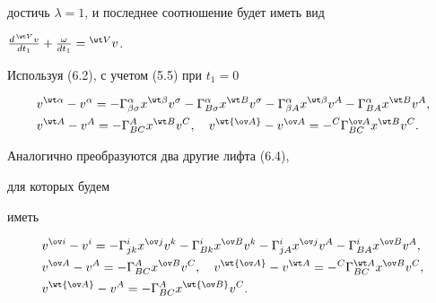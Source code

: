 достичь $\lambda=1$, и последнее соотношение будет иметь вид


$\frac{d\,{}^{\wt V}v}{dt_1}+\frac{\omega}{dt_1}=


{}^{\wt V}v$.


Используя (6.2), с учетом (5.5) при $t_1=0$


\begin{equation}


\begin{split}


&v^{\wt\alpha}-v^\alpha=-\Gamma^\alpha_{\beta\sigma}


x^{\wt\beta}v^\sigma-\Gamma^\alpha_{B\sigma}


x^{\wt B}v^\sigma-\Gamma^\alpha_{\beta A}x^{\wt\beta}v^A-


\Gamma^\alpha_{BA}x^{\wt B}v^A,\\


& v^{\wt A}-v^A=-\Gamma^A_{BC}x^{\wt B}v^C,\quad


v^{\wt{\ov A}}-v^{\ov A}=-{}^C\Gamma^{\ov A}_{BC}


x^{\wt B}v^C.


\end{split}


\end{equation}


Аналогично преобразуются два другие лифта (6.4),


для которых будем


иметь 


\begin{equation}


\begin{split}


& v^{\ov i}-v^i=-\Gamma^i_{jk}x^{\ov j}v^k-


\Gamma^i_{Bk}x^{\ov B}v^k-\Gamma^i_{jA}x^{\ov j}v^A-


\Gamma^i_{BA}x^{\ov B}v^A,\\


& v^{\ov A}-v^A=-\Gamma^A_{BC}x^{\ov B}v^C,\quad


v^{\wt{\ov A}}-v^{\wt A}=-{}^C\Gamma^{\wt A}_{BC}


x^{\ov B}v^C,\\


& v^{\wt{\ov A}}-v^A=-\Gamma^A_{BC}x^{\wt{\ov B}}v^C.


\end{split}


\end{equation}


